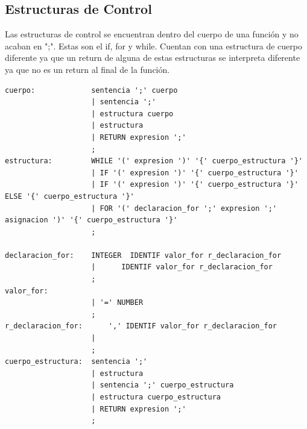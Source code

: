 \documentclass[12pt,a4paper]{article}
\begin{document}
\subsection{Estructuras de Control}
\noindent Las estructuras de control se encuentran dentro del cuerpo de una función y no acaban en ";". 
Estas son el if, for y while. Cuentan con una estructura de cuerpo diferente ya que un return de 
alguna de estas estructuras se interpreta diferente ya que no es un return al final de la función.
\begin{lstlisting}
cuerpo:             sentencia ';' cuerpo                        
                    | sentencia ';'                                
                    | estructura cuerpo                                                                    
                    | estructura                                  
                    | RETURN expresion ';'                        
                    ;
estructura:         WHILE '(' expresion ')' '{' cuerpo_estructura '}'                                    
                    | IF '(' expresion ')' '{' cuerpo_estructura '}'                                     
                    | IF '(' expresion ')' '{' cuerpo_estructura '}' ELSE '{' cuerpo_estructura '}'                                                                        
                    | FOR '(' declaracion_for ';' expresion ';' asignacion ')' '{' cuerpo_estructura '}'                                        
                    ;

declaracion_for:    INTEGER  IDENTIF valor_for r_declaracion_for    
                    |      IDENTIF valor_for r_declaracion_for                                           
                    ;
valor_for:                                                          
                    | '=' NUMBER                                                                                      
                    ;
r_declaracion_for:      ',' IDENTIF valor_for r_declaracion_for                                                    
                    |                                              
                    ;
cuerpo_estructura:  sentencia ';'                               
                    | estructura                                      
                    | sentencia ';' cuerpo_estructura           
                    | estructura cuerpo_estructura                        
                    | RETURN expresion ';'                                                           
                    ;
\end{lstlisting}
\end{document}
